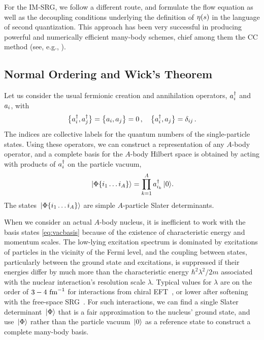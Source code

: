 For the IM-SRG, we follow a different route, and formulate the flow equation as well as the decoupling conditions underlying the definition of $\eta(s)$ in the language of second quantization. This approach has been very successful in producing powerful and numerically efficient many-body schemes, chief among them the CC method (see, e.g., \cite{Coester:1958dq,Coester:1960cr,Shavitt:2009,Hagen:2010uq}). 

\subsection{\label{sec:nord}Normal Ordering and Wick's Theorem}
Let us consider the usual fermionic creation and annihilation operators, ${{a}}^{\dag}_i$ and $a_i$, with
\begin{equation}
   \big\{ {{{a}}^{\dag}_i}, {{{a}}^{\dag}_j} \big\}  =  \big\{ {a_i}, {a_j} \big\}  = 0\,,\quad  \big\{ {{{a}}^{\dag}_i}, {a_j} \big\} =\delta_{ij}\,.
\end{equation}
The indices are collective labels for the quantum numbers of the single-particle states. Using these operators, we can construct a representation of any $A$-body operator, and a complete basis for the $A$-body Hilbert space is obtained by acting with products of ${{a}}^{\dag}_i$ on the particle vacuum,
\begin{equation}\label{eq:vacbasis}
  \ket{\Phi\{i_1\ldots i_A\}}=\prod_{k=1}^A\aaO_{i_k}\ket{0}.
\end{equation}
The states $\,|{\Phi\{i_1\ldots i_A\}}\rangle$ are simple $A$-particle Slater determinants.

When we consider an actual $A$-body nucleus, it is inefficient to work with the basis states \eqref{eq:vacbasis} because of the existence of characteristic energy and momentum scales. The low-lying excitation spectrum is dominated by excitations of particles in the vicinity of the Fermi level, and the coupling between states, particularly between the ground state and excitations, is suppressed if their energies differ by much more than the characteristic energy $\hbar^2\lambda^2/2m$ associated with the nuclear interaction's resolution scale $\lambda$. Typical values for $\lambda$ are on the order of $3-4\,\,\text{fm}^{-1}$ for interactions from chiral EFT~\cite{Epelbaum:2009ve}, or lower after softening with the free-space SRG~\cite{Bogner:2010pq}. For such interactions, we can find a single Slater determinant $\,|{\Phi}\rangle$ that is a fair approximation to the nucleus' ground state, and use $\,|{\Phi}\rangle$ rather than the particle vacuum $\,|{0}\rangle$ as a reference state to construct a complete many-body basis.

